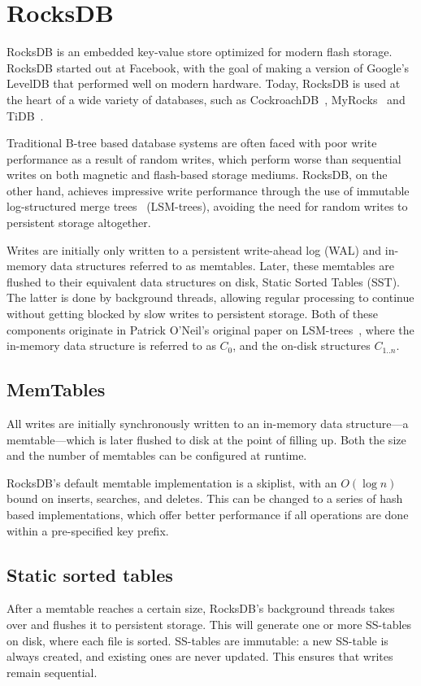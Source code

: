 \section{RocksDB}\label{sec:rocksdb}
RocksDB is an embedded key-value store optimized for modern flash storage.
RocksDB started out at Facebook, with the goal of making a version of Google's
LevelDB that performed well on modern hardware. Today, RocksDB is used at the
heart of a wide variety of databases, such as CockroachDB~\cite{cockroach},
MyRocks~\cite{myrocks} and TiDB~\cite{tidb}.

Traditional B-tree based database systems are often faced with poor write
performance as a result of random writes, which perform worse than sequential
writes on both magnetic and flash-based storage mediums. RocksDB, on the other
hand, achieves impressive write performance through the use of immutable
log-structured merge trees~\cite{lsm} (LSM-trees), avoiding the need for random
writes to persistent storage altogether.

Writes are initially only written to a persistent write-ahead log (WAL) and
in-memory data structures referred to as memtables. Later, these memtables are
flushed to their equivalent data structures on disk, Static Sorted Tables (SST).
The latter is done by background threads, allowing regular processing to
continue without getting blocked by slow writes to persistent storage. Both of
these components originate in Patrick O'Neil's original paper on
LSM-trees~\cite{lsm}, where the in-memory data structure is referred to as $ C_0
$, and the on-disk structures $ C_{1..n} $.

\subsection{MemTables}
All writes are initially synchronously written to an in-memory data structure---a
memtable---which is later flushed to disk at the point of filling up. Both the
size and the number of memtables can be configured at runtime.

RocksDB's default memtable implementation is a skiplist, with an $ O(\log n) $
bound on inserts, searches, and deletes. This can be changed to a series of hash
based implementations, which offer better performance if all operations are done
within a pre-specified key prefix.

\subsection{Static sorted tables}
After a memtable reaches a certain size, RocksDB's background threads takes over
and flushes it to persistent storage. This will generate one or more SS-tables
on disk, where each file is sorted. SS-tables are immutable: a new SS-table is
always created, and existing ones are never updated. This ensures that writes
remain sequential.

